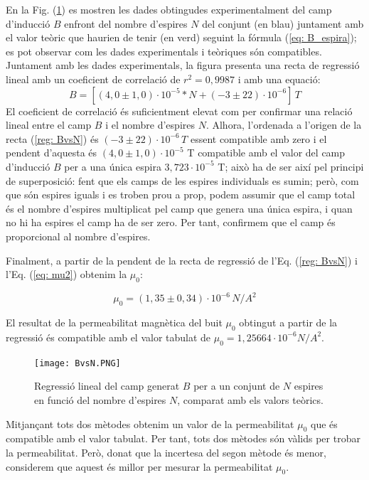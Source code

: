 \documentclass[11pt]{article}
\numberwithin{equation}{section}
\numberwithin{figure}{section}
\numberwithin{table}{section}
\begin{document}
En la Fig. (\ref{fig:BvsN}) es mostren les dades obtingudes experimentalment del camp d'inducció $B$ enfront del nombre d'espires $N$ del conjunt (en blau) juntament amb el valor teòric que haurien de tenir (en verd) seguint la fórmula (\ref{eq: B_espira}); es pot observar com les dades experimentals i teòriques són compatibles.
Juntament amb les dades experimentals, la figura presenta una recta de regressió lineal amb un coeficient de correlació de $r^2=0,9987$ i amb una equació:
\begin{equation} \label{reg: BvsN}
    B = [(4,0 \pm 1,0) \cdot10^{-5} *N +(-3 \pm 22)\cdot10^{-6}] \, T
\end{equation}
El coeficient de correlació és suficientment elevat com per confirmar una relació lineal entre el camp $B$ i el nombre d'espires $N$. Alhora, l'ordenada a l'origen de la recta (\ref{reg: BvsN}) és $(-3 \pm 22)\cdot10^{-6} \, T$ essent compatible amb zero i el pendent d'aquesta és $(4,0 \pm 1,0)\cdot10^{-5}$ T compatible amb el valor del camp d'inducció $B$ per a una única espira $3,723\cdot10^{-5}$ T; això ha de ser així pel principi de superposició: fent que els camps de les espires individuals es sumin; però, com que són espires iguals i es troben prou a prop, podem assumir que el camp total és el nombre d'espires multiplicat pel camp que genera una única espira, i quan no hi ha espires el camp ha de ser zero. Per tant, confirmem que el camp és proporcional al nombre d'espires.

Finalment, a partir de la pendent de la recta de regressió de l'Eq. (\ref{reg: BvsN}) i l'Eq. (\ref{eq: mu2}) obtenim la $\mu_0$:

\[
\boxed{\mu_0=(1,35\pm0,34)\cdot10^{-6} \, N/A^2}
\]

El resultat de la permeabilitat magnètica del buit $\mu_0$ obtingut a partir de la regressió és compatible amb el valor tabulat de $\mu_0 = 1,25664\cdot 10^{-6} N/A^2$.

\begin{figure}[H]
    \centering
    \texttt{[image: BvsN.PNG]}
    \caption{Regressió lineal del camp generat $B$ per a un conjunt de $N$ espires en funció del nombre d'espires $N$, comparat amb els valors teòrics.}
    \label{fig:BvsN}
\end{figure}

Mitjançant tots dos mètodes obtenim un valor de la permeabilitat $\mu_0$ que és compatible amb el valor tabulat. Per tant, tots dos mètodes són vàlids per trobar la permeabilitat. Però, donat que la incertesa del segon mètode és menor, considerem que aquest és millor per mesurar la permeabilitat $\mu_0$.
\end{document}
